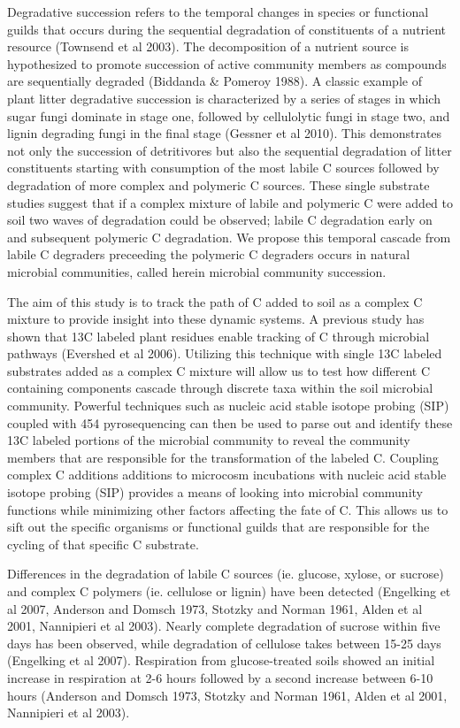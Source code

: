     Degradative succession refers to the temporal changes in species or functional guilds that occurs during the sequential degradation of constituents of a nutrient resource (Townsend et al 2003).  The decomposition of a nutrient source is hypothesized to promote succession of active community members as compounds are sequentially degraded (Biddanda & Pomeroy 1988).  A classic example of plant litter degradative succession is characterized by a series of stages in which sugar fungi dominate in stage one, followed by cellulolytic fungi in stage two, and lignin degrading fungi in the final stage (Gessner et al 2010).  This demonstrates not only the succession of detritivores but also the sequential degradation of litter constituents starting with consumption of the most labile C sources followed by degradation of more complex and polymeric C sources. These single substrate studies suggest that if a complex mixture of labile and polymeric C were added to soil two waves of degradation could be observed; labile C degradation early on and subsequent polymeric C degradation.  We propose this temporal cascade from labile C degraders preceeding the polymeric C degraders occurs in natural microbial communities, called herein microbial community succession.  

The aim of this study is to track the path of C added to soil as a complex C mixture to provide insight into these dynamic systems.  A previous study has shown that 13C labeled plant residues enable tracking of C through microbial pathways (Evershed et al 2006).  Utilizing this technique with single 13C labeled substrates added as a complex C mixture will allow us to test how different C containing components cascade through discrete taxa within the soil microbial community. Powerful techniques such as nucleic acid stable isotope probing (SIP) coupled with 454 pyrosequencing can then be used to parse out and identify these 13C labeled portions of the microbial community to reveal the community members that are responsible for the transformation of the labeled C. Coupling complex C additions additions to microcosm incubations with nucleic acid stable isotope probing (SIP) provides a means of looking into microbial community functions while minimizing other factors affecting the fate of C.  This allows us to sift out the specific organisms or functional guilds that are responsible for the cycling of that specific C substrate.  

Differences in the degradation of labile C sources (ie. glucose, xylose, or sucrose) and complex C polymers (ie. cellulose or lignin) have been detected (Engelking et al 2007, Anderson and Domsch 1973, Stotzky and Norman 1961, Alden et al 2001, Nannipieri et al 2003).  Nearly complete degradation of sucrose within five days has been observed, while degradation of cellulose takes between 15-25 days (Engelking et al 2007).  Respiration from glucose-treated soils showed an initial increase in respiration at 2-6 hours followed by a second increase between 6-10 hours (Anderson and Domsch 1973, Stotzky and Norman 1961, Alden et al 2001, Nannipieri et al 2003).

